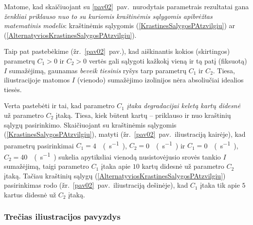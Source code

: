 \documentclass[a4paper,12pt]{article}
\begin{document}
Matome, kad skaičiuojant su \ref{pav02}~pav.\ nurodytais parametrais rezultatai gana
\emph{ženkliai priklauso nuo to su kuriomis kraštinėmis sąlygomis apibrėžtas matematinis modelis}:
kraštinėmis sąlygomis (\ref{KrastinesSalygosPAtzvilgiu}) ar (\ref{AlternatyviosKrastinesSalygosPAtzvilgiu}).

Taip pat pastebėkime (žr.\ \ref{pav02}~pav.), kad aiškinantis kokios (skirtingos) parametrų $C_1>0$ ir $C_2>0$ vertės gali sąlygoti kažkokį vieną ir tą patį (fiksuotą) $I$ sumažėjimą,
gaunamas \textit{beveik tiesinis} ryšys tarp parametrų $C_1$ ir $C_2$. Tiesa, iliustracijoje matomos $I$ (vienodo) sumažėjimo izolinijos nėra absoliučiai idealios tiesės.

Verta pastebėti ir tai, kad parametro $C_1$ \textit{įtaka degradacijai keletą kartų didesnė} už parametro $C_2$ įtaką.
Tiesa, kiek būtent kartų -- priklauso ir nuo kraštinių sąlygų pasirinkimo.
Skaičiuojant su kraštinėmis sąlygomis (\ref{KrastinesSalygosPAtzvilgiu}), matyti (žr.\ \ref{pav02}~pav.\ iliustraciją kairėje), kad
parametrų pasirinkimai $C_1 ={}$\SI{4}{\milli(s^{-1})}, $C_2 ={}$\SI{0}{\milli(s^{-1})} ir $C_1 ={}$\SI{0}{\milli(s^{-1})}, $C_2 ={}$\SI{40}{\milli(s^{-1})}
sukelia apytiksliai vienodą nusistovėjusio srovės tankio $I$ sumažėjimą, taigi parametro $C_1$ įtaka apie $10$ kartų didesnė už parametro $C_2$ įtaką.
Tačiau kraštinių sąlygų (\ref{AlternatyviosKrastinesSalygosPAtzvilgiu}) pasirinkimas rodo (žr.\ \ref{pav02}~pav.\ iliustraciją dešinėje), kad
$C_1$ įtaka tik apie $5$ kartus didesnė už $C_2$ įtaką.

\subsubsection{Trečias iliustracijos pavyzdys}
\end{document}
